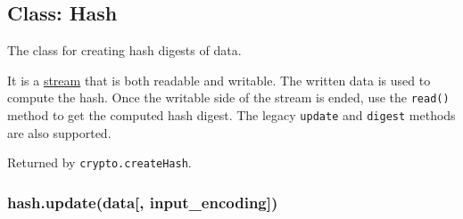 \begin{Shaded}
\begin{Highlighting}[]
 \NormalTok{[}\NormalTok{];}
 \NormalTok{(}\NormalTok{);}
 \NormalTok{(}\NormalTok{);}

 \NormalTok{(}\NormalTok{);}

 
\NormalTok{(}\NormalTok{, }
\NormalTok{\});}

\NormalTok{(}\NormalTok{, }\NormalTok{() \{}
   \NormalTok{(}\NormalTok{);}
   
\NormalTok{\});}
\end{Highlighting}
\end{Shaded}

\subsection{Class: Hash}\label{class-hash}

The class for creating hash digests of data.

It is a \href{stream.html}{stream} that is both readable and writable.
The written data is used to compute the hash. Once the writable side of
the stream is ended, use the \texttt{read()} method to get the computed
hash digest. The legacy \texttt{update} and \texttt{digest} methods are
also supported.

Returned by \texttt{crypto.createHash}.

\subsubsection{hash.update(data{[},
input\_encoding{]})}\label{hash.updatedata-inputux5fencoding}

